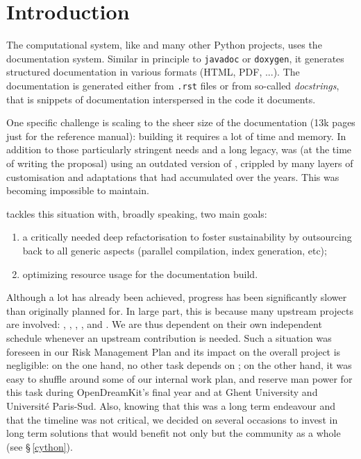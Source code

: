 \documentclass{deliverablereport}
\author{Jeroen Demeyer}
\begin{document}
\maketitle
\tableofcontents


\section{Introduction}

The \Sage computational system, like \Python and many other Python
projects, uses the \Sphinx documentation system. Similar in principle
to \lstinline{javadoc} or \lstinline{doxygen}, it generates structured
documentation in various formats (HTML, PDF, ...).
The documentation is generated either from \texttt{.rst} files
or from so-called \emph{docstrings}, that is snippets of documentation
interspersed in the code it documents.

One specific challenge is scaling to the sheer size of the \Sage
documentation (13k pages just for the reference manual): building it
requires a lot of time and memory. In addition to those particularly
stringent needs and a long legacy, \Sage was (at the time of writing
the proposal) using an outdated version of \Sphinx, crippled by many
layers of customisation and adaptations that had accumulated over the
years. This was becoming impossible to maintain.

 tackles this situation with, broadly
speaking, two main goals:
\begin{enumerate}
\item a critically needed deep refactorisation to
  foster sustainability by outsourcing back to
  \Sphinx all generic aspects (parallel compilation, index generation,
  etc);
\item optimizing resource usage for the documentation build.
\end{enumerate}

Although a lot has already been achieved, progress has been
significantly slower than originally planned for. In large part, this
is because many upstream projects are involved: \Sphinx, \Docutils,
\Pygments, \Cython, and \Python. We are thus dependent on their own
independent schedule whenever an upstream contribution is needed. Such
a situation was foreseen in our Risk Management Plan and its impact on
the overall project is negligible: on the one hand, no other task
depends on ; on the other hand, it was easy to
shuffle around some of our internal work plan, and reserve man power
for this task during OpenDreamKit's final year and at Ghent University
and Université Paris-Sud. Also, knowing that this was a long term
endeavour and that the timeline was not critical, we decided on
several occasions to invest in long term solutions that would benefit
not only \Sage but the community as a whole (see \S\,\ref{cython}).
\end{document}
